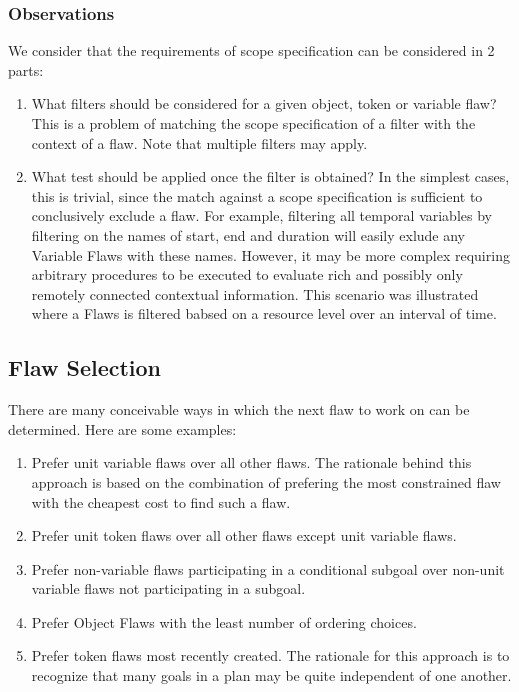 \documentclass[10pt, letterpaper, oneside]{article}
\begin{document}
\subsubsection{Observations}
We consider that the requirements of scope specification can be considered in 2 parts:
\begin{enumerate}
\item What filters should be considered for a given object, token or variable flaw? This is a problem of matching the scope specification of a filter with the context of a flaw. Note that multiple filters may apply.
\item What test should be applied once the filter is obtained? In the simplest cases, this is trivial, since the match against a scope specification is sufficient to conclusively exclude a flaw. For example, filtering all temporal variables by filtering on the names of start, end and duration will easily exlude any Variable Flaws with these names. However, it may be more complex requiring arbitrary procedures to be executed to evaluate rich and possibly only remotely connected contextual information. This scenario was illustrated where a Flaws is filtered babsed on a resource level over an interval of time.
\end{enumerate}

\subsection{Flaw Selection}
There are many conceivable ways in which the next flaw to work on can be determined. Here are some examples:
\begin{enumerate}
\item Prefer unit variable flaws over all other flaws. The rationale behind this approach is based on the combination of prefering the most constrained flaw with the cheapest cost to find such a flaw.
\item Prefer unit token flaws over all other flaws except unit variable flaws.
\item Prefer non-variable flaws participating in a conditional subgoal over non-unit variable flaws not participating in a subgoal.
\item Prefer Object Flaws with the least number of ordering choices.
\item Prefer token flaws most recently created. The rationale for this approach is to recognize that many goals in a plan may be quite independent of one another. 
\end{enumerate}
\end{document}
